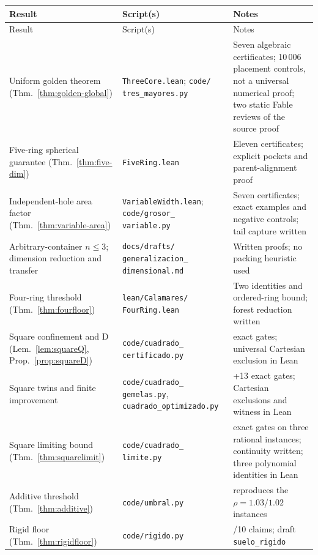 \documentclass[11pt]{article}
\theoremstyle{definition}
\begin{document}
\begin{center}
\small
\begin{longtable}{>{\raggedright\arraybackslash}p{}>{\raggedright\arraybackslash}p{}>{\raggedright\arraybackslash}p{}}
\hline
Result & Script(s) & Notes \\
\hline
\endfirsthead
\hline
Result & Script(s) & Notes \\
\hline
\endhead
Uniform golden theorem (Thm.~\ref{thm:golden-global}) &
\texttt{ThreeCore.lean}; \texttt{code/}\allowbreak
\texttt{tres\_}\allowbreak\texttt{mayores.py} &
Seven algebraic certificates; 10\,006 placement controls, not a universal
numerical proof; two static Fable reviews of the source proof \\
Five-ring spherical guarantee (Thm.~\ref{thm:five-dim}) &
\texttt{FiveRing.lean} &
Eleven certificates; explicit pockets and parent-alignment proof \\
Independent-hole area factor (Thm.~\ref{thm:variable-area}) &
\texttt{VariableWidth.lean}; \texttt{code/grosor\_}\allowbreak
\texttt{variable.py} &
Seven certificates; exact examples and negative controls; tail capture written \\
Arbitrary-container $n\le3$; dimension reduction and transfer &
\texttt{docs/drafts/} \texttt{generalizacion\_}\allowbreak
\texttt{dimensional.md} &
Written proofs; no packing heuristic used \\
Four-ring threshold (Thm.~\ref{thm:fourfloor}) &
\texttt{lean/Calamares/} \texttt{FourRing.lean} &
Two identities and ordered-ring bound; forest reduction written \\
Square confinement and D (Lem.~\ref{lem:squareQ}, Prop.~\ref{prop:squareD}) &
\texttt{code/cuadrado\_} \texttt{certificado.py} &
17 exact gates; universal Cartesian exclusion in Lean \\
Square twins and finite improvement &
\texttt{code/cuadrado\_} \texttt{gemelas.py},
\texttt{cuadrado\_optimizado.py} &
17+13 exact gates; Cartesian exclusions and witness in Lean \\
Square limiting bound (Thm.~\ref{thm:squarelimit}) &
\texttt{code/cuadrado\_} \texttt{limite.py} &
39 exact gates on three rational instances; continuity written;
three polynomial identities in Lean \\
Additive threshold (Thm.~\ref{thm:additive}) & \texttt{code/umbral.py} & reproduces the $\rho=1.03$/$1.02$ instances \\
Rigid floor (Thm.~\ref{thm:rigidfloor}) & \texttt{code/rigido.py} & 10/10 claims; draft \texttt{suelo\_rigido} \\

\end{longtable}
\end{center}
\end{document}
